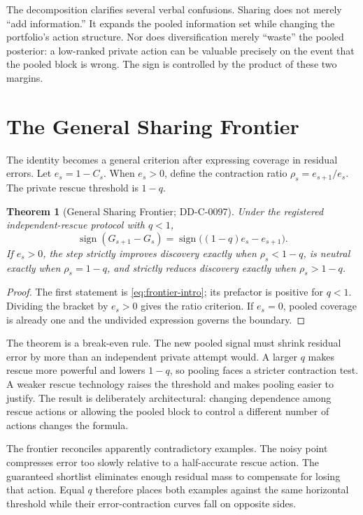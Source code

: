 \documentclass[12pt]{article}
\newtheorem{theorem}{Theorem}
\theoremstyle{definition}
\begin{document}
The decomposition clarifies several verbal confusions. Sharing does not merely
``add information.'' It expands the pooled information set while changing the
portfolio's action structure. Nor does diversification merely ``waste'' the
pooled posterior: a low-ranked private action can be valuable precisely on the
event that the pooled block is wrong. The sign is controlled by the product of
these two margins.

\section{The General Sharing Frontier}

The identity becomes a general criterion after expressing coverage in residual
errors. Let $e_s=1-C_s$. When $e_s>0$, define the contraction ratio
$\rho_s=e_{s+1}/e_s$. The private rescue threshold is $1-q$.

\begin{theorem}[General Sharing Frontier; DD-C-0097]
Under the registered independent-rescue protocol with $q<1$,
\[
 \operatorname{sign}(G_{s+1}-G_s)
 =\operatorname{sign}\big((1-q)e_s-e_{s+1}\big).
\]
If $e_s>0$, the step strictly improves discovery exactly when
$\rho_s<1-q$, is neutral exactly when $\rho_s=1-q$, and strictly reduces
discovery exactly when $\rho_s>1-q$.
\end{theorem}

\begin{proof}
The first statement is \cref{eq:frontier-intro}; its prefactor is positive for
$q<1$. Dividing the bracket by $e_s>0$ gives the ratio criterion. If $e_s=0$,
pooled coverage is already one and the undivided expression governs the boundary.
\end{proof}

The theorem is a break-even rule. The new pooled signal must shrink residual
error by more than an independent private attempt would. A larger $q$ makes
rescue more powerful and lowers $1-q$, so pooling faces a stricter contraction
test. A weaker rescue technology raises the threshold and makes pooling easier
to justify. The result is deliberately architectural: changing dependence among
rescue actions or allowing the pooled block to control a different number of
actions changes the formula.



The frontier reconciles apparently contradictory examples. The noisy point
compresses error too slowly relative to a half-accurate rescue action. The
guaranteed shortlist eliminates enough residual mass to compensate for losing
that action. Equal $q$ therefore places both examples against the same horizontal
threshold while their error-contraction curves fall on opposite sides.
\end{document}
